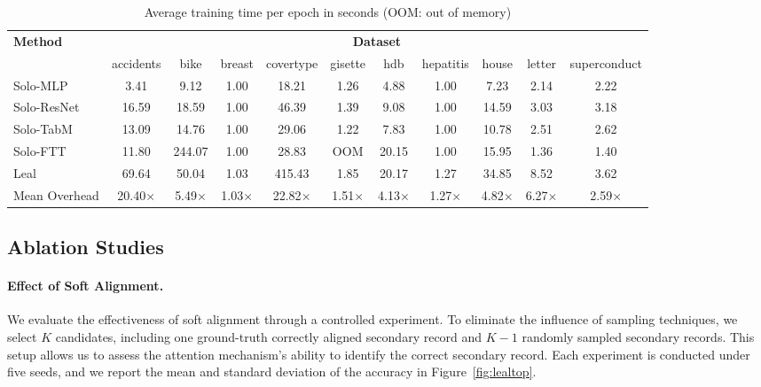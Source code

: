 \begin{table*}[t!]
    \centering
    \caption{Average training time per epoch in seconds (OOM: out of memory)}\label{tab:train-time}
    \small
    \vskip 0.15in
    \begin{tabular}{lcccccccccc}
    \toprule
    \multirow{2}{*}{\textbf{Method}} & \multicolumn{10}{c}{\textbf{Dataset}} \\
    \cmidrule{2-11}
    & accidents & bike & breast & covertype & gisette & hdb & hepatitis & house & letter & superconduct\\
    \midrule
    Solo-MLP & 3.41 & 9.12 & 1.00 & 18.21 & 1.26 & 4.88 & 1.00 & 7.23 & 2.14 & 2.22 \\
    Solo-ResNet & 16.59 & 18.59 & 1.00 & 46.39 & 1.39 & 9.08 & 1.00 & 14.59 & 3.03 & 3.18 \\
    Solo-TabM & 13.09 & 14.76 & 1.00 & 29.06 & 1.22 & 7.83 & 1.00 & 10.78 & 2.51 & 2.62 \\
    Solo-FTT & 11.80 & 244.07 & 1.00 & 28.83 & OOM & 20.15 & 1.00 & 15.95 & 1.36 & 1.40 \\
    \midrule
    Leal & 69.64 & 50.04 & 1.03 & 415.43 & 1.85 & 20.17 & 1.27 & 34.85 & 8.52 & 3.62 \\
    Mean Overhead & 20.40$\times$ & 5.49$\times$ & 1.03$\times$ & 22.82$\times$ & 1.51$\times$ & 4.13$\times$ & 1.27$\times$ & 4.82$\times$ & 6.27$\times$ & 2.59$\times$ \\
    \bottomrule
    \end{tabular}
\end{table*}



\subsection{Ablation Studies}

\paragraph{Effect of Soft Alignment.}
We evaluate the effectiveness of soft alignment through a controlled experiment. To eliminate the influence of sampling techniques, we select $K$ candidates, including one ground-truth correctly aligned secondary record and $K-1$ randomly sampled secondary records. This setup allows us to assess the attention mechanism's ability to identify the correct secondary record. Each experiment is conducted under five seeds, and we report the mean and standard deviation of the accuracy in Figure~\ref{fig:lealtop}.

